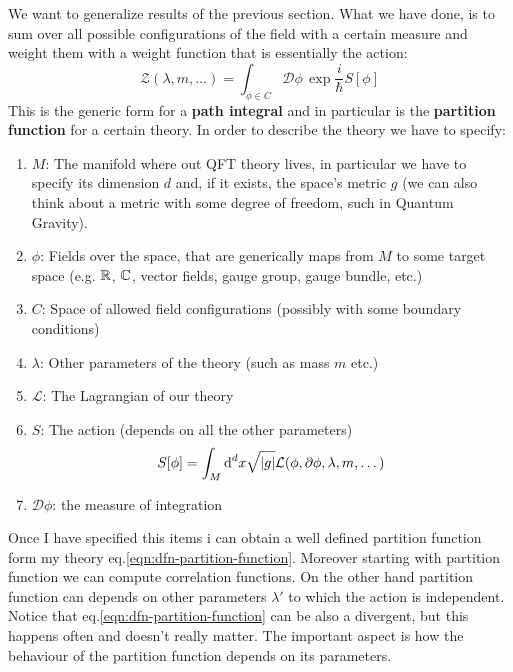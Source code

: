 \documentclass[../main/main.tex]{subfiles}
\begin{document}
We want to generalize results of the previous section. 
What we have done, is to sum over all possible configurations of the field with a certain measure and weight them with a weight function that is essentially the action:
\begin{equation}\label{eqn:dfn-partition-function}\boxed{
\mathcal Z(\lambda, m,\dots)=\int_{\phi\in C}\mathcal  D\phi\,\exp{\frac i\hbar S[\phi]}
}\end{equation}
This is the generic form for a \textbf{path integral} and in particular is the \textbf{partition function} for a certain theory. In order to describe the theory we have to specify:
\begin{enumerate}
\item $M$: The manifold where out QFT theory lives, in particular we have to specify its dimension $d$ and, if it exists, the space's metric $g$ (we can also think about a metric with some degree of freedom, such in Quantum Gravity).
\item $\phi$: Fields over the space, that are generically maps from $M$ to some target space (e.g. $\mathbb{R}$, $\mathbb{C}$, vector fields, gauge group, gauge bundle, etc.)
\item $C$: Space of allowed field configurations (possibly with some boundary conditions)
\item $\lambda$: Other parameters of the theory (such as mass $m$ etc.)
\item $\mathcal L$: The Lagrangian of our theory
\item $S$: The action (depends on all the other parameters)
\[S[\phi]=\int_M\textup{d}^dx\sqrt{|g|}\mathcal L(\phi, \partial \phi, \lambda, m, \dots)\]
\item$\mathcal D\phi$: the measure of integration
\end{enumerate}
%
Once I have specified this items i can obtain a well defined partition function form my theory eq.\eqref{eqn:dfn-partition-function}. Moreover starting with partition function we can compute correlation functions.
On the other hand partition function can depends on other parameters $\lambda'$ to which the action is independent. Notice that  eq.\eqref{eqn:dfn-partition-function} can be also a divergent, but this happens often and doesn't really matter. The important aspect is how the behaviour of the partition function depends on its parameters. 
\end{document}
